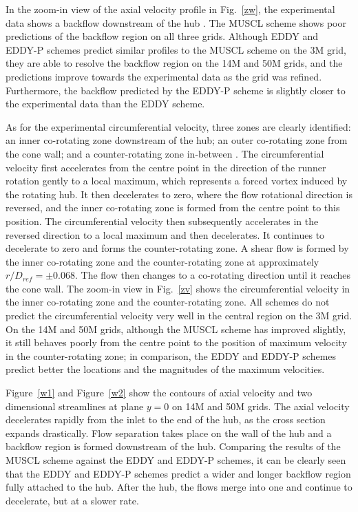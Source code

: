 In the zoom-in view of the axial velocity profile in Fig.~\ref{zw}, the experimental data shows a backflow downstream of the hub \cite{vuillemard2014experimental}. The MUSCL scheme shows poor predictions of the backflow region on all three grids. Although EDDY and EDDY-P schemes predict similar profiles to the MUSCL scheme on the 3M grid, they are able to resolve the backflow region on the 14M and 50M grids, and the predictions improve towards the experimental data as the grid was refined. Furthermore, the backflow predicted by the EDDY-P scheme is slightly closer to the experimental data than the EDDY scheme.

As for the experimental circumferential velocity, three zones are clearly identified: an inner co-rotating zone downstream of the hub; an outer co-rotating zone from the cone wall; and a counter-rotating zone in-between \cite{vuillemard2014experimental}. The circumferential velocity first accelerates from the centre point in the direction of the runner rotation gently to a local maximum, which represents a forced vortex induced by the rotating hub. It then decelerates to zero, where the flow rotational direction is reversed, and the inner co-rotating zone is formed from the centre point to this position. The circumferential velocity then subsequently accelerates in the reversed direction to a local maximum and then decelerates. It continues to decelerate to zero and forms the counter-rotating zone.  A shear flow is formed by the inner co-rotating zone and the counter-rotating zone at approximately $r/D_{ref}=\pm 0.068$. The flow then changes to a co-rotating direction until it reaches the cone wall. The zoom-in view in Fig.~\ref{zv} shows the circumferential velocity in the inner co-rotating zone and the counter-rotating zone. All schemes do not predict the circumferential velocity very well in the central region on the 3M grid. On the 14M and 50M grids, although the MUSCL scheme has improved slightly, it still behaves poorly from the centre point to the position of maximum velocity in the counter-rotating zone; in comparison, the EDDY and EDDY-P schemes predict better the locations and the magnitudes of the maximum velocities.

Figure~\ref{w1} and Figure~\ref{w2} show the contours of axial velocity and two dimensional streamlines at plane $y=0$ on 14M and 50M grids. The axial velocity decelerates rapidly from the inlet to the end of the hub, as the cross section expands drastically. Flow separation takes place on the wall of the hub and a backflow region is formed downstream of the hub. Comparing the results of the MUSCL scheme against the EDDY and EDDY-P schemes, it can be clearly seen that the EDDY and EDDY-P schemes predict a wider and longer backflow region fully attached to the hub. After the hub, the flows merge into one and continue to decelerate, but at a slower rate.

